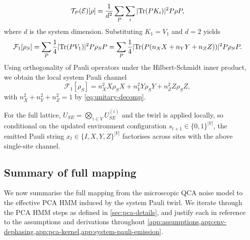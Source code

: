 \begin{equation}
    \mathcal{T}_P(\mathcal{E})[\rho] = \frac{1}{d^2} \sum_P \sum_i |\mathrm{Tr}(P K_i)|^2 P \rho P,
\end{equation}
where \(d\) is the system dimension. Substituting \(K_1 = V_1\) and \(d=2\) yields
\begin{equation}
    \mathcal{F}_1[\rho_S] 
    = \sum_P \frac{1}{4}|\mathrm{Tr}(PV_1)|^2 P \rho_S P 
    = \sum_P \frac{1}{4}|\mathrm{Tr}(P (n_X X + n_Y Y + n_Z Z))|^2 P \rho_S P.
\end{equation}
Using orthogonality of Pauli operators under the Hilbert-Schmidt inner product, we obtain the local system Pauli channel
\begin{equation}
    \mathcal{F}_1[\rho_S] = n_X^2 X \rho_S X + n_Y^2 Y \rho_S Y + n_Z^2 Z \rho_S Z,
\end{equation}
with \(n_X^2 + n_Y^2 + n_Z^2 = 1\) by \cref{eq:unitary-decomp}.

For the full lattice, \(U_{SE} = \bigotimes_{i\in V} U_{SE}^{(i)}\) and the twirl is applied locally, so conditional on the updated environment configuration \(s_{t+1} \in \{0,1\}^{|V|}\), the emitted Pauli string \(x_t \in \{I, X, Y, Z\}^{|V|}\) factorises across sites with the above single-site channel.

\subsection{Summary of full mapping}\label{app:summary-mapping}
We now summarise the full mapping from the microscopic QCA noise model to the effective PCA HMM induced by the system Pauli twirl. We iterate through the PCA HMM steps as defined in \cref{sec:pca-details}, and justify each in reference to the assumptions and derivations throughout \cref{app:assumptions,app:env-dephasing,app:pca-kernel,app:system-pauli-emission}.

